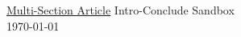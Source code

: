 \documentclass[12pt,english]{article}
\begin{document}
\begingroup
  \centering
  \LARGE \href{https://fanwangecon.github.io/Tex4Econ/#5-multi-section-article}{Multi-Section Article} Intro-Conclude Sandbox \\
  \large \today \par
\endgroup


% 
% 
% 


\end{document}
